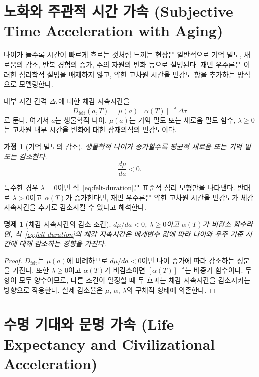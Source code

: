 \documentclass[11pt]{article}
\newtheorem{proposition}{명제}
\newtheorem{assumption}{가정}
\theoremstyle{remark}
\begin{document}
\section{노화와 주관적 시간 가속 (Subjective Time Acceleration with Aging)}

나이가 들수록 시간이 빠르게 흐르는 것처럼 느끼는 현상은 일반적으로 기억
밀도, 새로움의 감소, 반복 경험의 증가, 주의 자원의 변화 등으로 설명된다.
재민 우주론은 이러한 심리학적 설명을 배제하지 않고, 약한 고차원 시간율
민감도 항을 추가하는 방식으로 모델링한다.

내부 시간 간격 $\Delta\tau$에 대한 체감 지속시간을
\begin{equation}
  D_{\mathrm{felt}}(a,T)
  =
  \mu(a)\,[\alpha(T)]^{-\lambda}\,\Delta\tau
  \label{eq:felt-duration}
\end{equation}
로 둔다. 여기서 $a$는 생물학적 나이, $\mu(a)$는 기억 밀도 또는 새로움
밀도 함수, $\lambda\ge 0$는 고차원 내부 시간율 변화에 대한 잠재의식의
민감도이다.

\begin{assumption}[기억 밀도의 감소]
생물학적 나이가 증가할수록 평균적 새로움 또는 기억 밀도는 감소한다.
\begin{equation}
  \frac{d\mu}{da}<0.
\end{equation}
\end{assumption}

특수한 경우 $\lambda=0$이면 식~\eqref{eq:felt-duration}은 표준적 심리
모형만을 나타낸다. 반대로 $\lambda>0$이고 $\alpha(T)$가 증가한다면,
재민 우주론은 약한 고차원 시간율 민감도가 체감 지속시간을 추가로 감소시킬
수 있다고 해석한다.

\begin{proposition}[체감 지속시간의 감소 조건]
$d\mu/da<0$, $\lambda\ge 0$이고 $\alpha(T)$가 비감소 함수라면,
식~\eqref{eq:felt-duration}의 체감 지속시간은 매개변수 값에 따라 나이와
우주 기준 시간에 대해 감소하는 경향을 가진다.
\end{proposition}

\begin{proof}
$D_{\mathrm{felt}}$는 $\mu(a)$에 비례하므로 $d\mu/da<0$이면 나이 증가에
따라 감소하는 성분을 가진다. 또한 $\lambda\ge 0$이고 $\alpha(T)$가
비감소이면 $[\alpha(T)]^{-\lambda}$는 비증가 함수이다. 두 항이 모두
양수이므로, 다른 조건이 일정할 때 두 효과는 체감 지속시간을 감소시키는
방향으로 작용한다. 실제 감소율은 $\mu$, $\alpha$, $\lambda$의 구체적
형태에 의존한다.
\end{proof}

\section{수명 기대와 문명 가속 (Life Expectancy and Civilizational Acceleration)}
\end{document}
